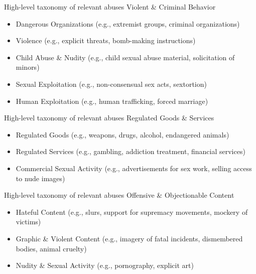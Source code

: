 \documentclass[nobackground,dvipsnames,table]{beamer}
\begin{document}
\begin{frame}{High-level taxonomy of relevant abuses}
	Violent \& Criminal Behavior
	\begin{itemize}
		\item Dangerous Organizations (e.g., extremist groups, criminal organizations)
		\item Violence (e.g., explicit threats, bomb-making instructions)
		\item Child Abuse \& Nudity (e.g., child sexual abuse material, solicitation of minors)
		\item Sexual Exploitation (e.g., non-consensual sex acts, sextortion)
		\item Human Exploitation (e.g., human trafficking, forced marriage)
	\end{itemize}
\end{frame}


\begin{frame}{High-level taxonomy of relevant abuses}
	Regulated Goods \& Services
	\begin{itemize}
		\item Regulated Goods (e.g., weapons, drugs, alcohol, endangered animals)
		\item Regulated Services (e.g., gambling, addiction treatment, financial services)
		\item Commercial Sexual Activity (e.g., advertisements for sex work, selling access to nude images)
	\end{itemize}
\end{frame}

\begin{frame}{High-level taxonomy of relevant abuses}
	Offensive \& Objectionable Content
	\begin{itemize}
		\item Hateful Content (e.g., slurs, support for supremacy movements, mockery of victims)
		\item Graphic \& Violent Content (e.g., imagery of fatal incidents, dismembered bodies, animal cruelty)
		\item Nudity \& Sexual Activity (e.g., pornography, explicit art)
	\end{itemize}
\end{frame}
\end{document}
